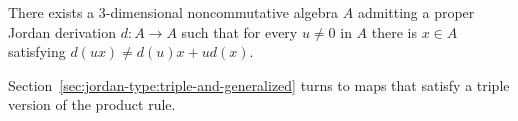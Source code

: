 \begin{example}\label{ex:jordan:bresar-three}
There exists a $3$-dimensional noncommutative algebra $A$ admitting a proper Jordan
derivation $d\colon A\to A$ such that for every $u\neq0$ in $A$ there is $x\in A$
satisfying $d(ux)\neq d(u)x+ud(x)$.
\end{example}

Section~\ref{sec:jordan-type:triple-and-generalized} turns to maps that satisfy a
triple version of the product rule.
